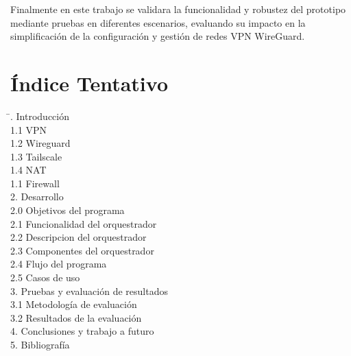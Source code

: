 \documentclass[letterpaper,12pt,oneside]{article}
\begin{document}
Finalmente en este trabajo se validara la funcionalidad y robustez del prototipo mediante pruebas en diferentes escenarios, evaluando su impacto en la simplificación de la configuración y gestión de redes VPN WireGuard.

\section{Índice Tentativo}
\begin{flushleft}
    \begin{tabbing}
    \hspace{4cm} \= . Introducción \> \dotfill  \\
    \hspace{0.5cm}1.1 VPN \> \dotfill  \\
    \hspace{0.5cm}1.2 Wireguard \> \dotfill  \\
    \hspace{0.5cm}1.3 Tailscale \> \dotfill  \\
    \hspace{0.5cm}1.4 NAT \> \dotfill  \\
    \hspace{0.5cm}1.1 Firewall \> \dotfill  \\

    2. Desarrollo \> \dotfill  \\

    \hspace{0.5cm}2.0 Objetivos del programa \> \dotfill  \\
    \hspace{0.5cm}2.1 Funcionalidad del orquestrador \> \dotfill  \\
    \hspace{0.5cm}2.2 Descripcion del orquestrador \> \dotfill  \\
    \hspace{0.5cm}2.3 Componentes del orquestrador \> \dotfill  \\
    \hspace{0.5cm}2.4 Flujo del programa \> \dotfill  \\
    \hspace{0.5cm}2.5 Casos de uso \> \dotfill  \\
    
    3. Pruebas y evaluación de resultados \> \dotfill \\
    \hspace{0.5cm}3.1 Metodología de evaluación \> \dotfill \\
    \hspace{0.5cm}3.2 Resultados de la evaluación \> \dotfill \\
    4. Conclusiones y trabajo a futuro \> \dotfill  \\
    5. Bibliografía \> \dotfill \\
    \end{tabbing}
    \end{flushleft}
\end{document}
